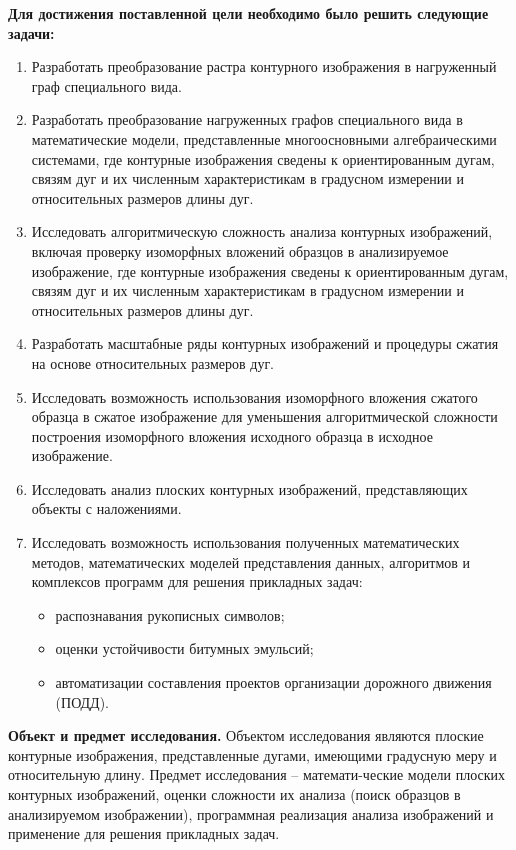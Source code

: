 \textbf{Для достижения поставленной цели необходимо было решить следующие задачи:}	
\begin{enumerate}
\item Разработать преобразование растра контурного изображения в нагруженный граф специального вида.
\item Разработать преобразование нагруженных графов специального вида в математические модели, представленные многоосновными алгебраическими системами, где контурные изображения сведены к ориентированным дугам, связям дуг и их численным характеристикам в градусном измерении и  относительных размеров  длины дуг.
\item Исследовать алгоритмическую сложность  анализа контурных изображений, включая проверку изоморфных вложений образцов в анализируемое изображение, где контурные изображения сведены к ориентированным дугам, связям дуг и их численным характеристикам в градусном измерении и  относительных размеров  длины дуг.
\item Разработать  масштабные ряды контурных изображений и процедуры сжатия на  основе относительных размеров дуг.
\item Исследовать возможность использования  изоморфного вложения сжатого образца в сжатое изображение для уменьшения алгоритмической сложности построения  изоморфного вложения исходного образца в исходное изображение.
\item Исследовать анализ плоских контурных изображений, представляющих объекты с наложениями.
\item Исследовать возможность использования полученных математических методов, математических моделей представления данных, алгоритмов и комплексов программ для решения прикладных задач:
\begin{itemize}
   \item распознавания рукописных символов;
   \item  оценки устойчивости битумных эмульсий;
   \item  автоматизации составления проектов организации дорожного движения (ПОДД). 
\end{itemize}
\end{enumerate}

\textbf{Объект и предмет исследования.}  Объектом исследования являются плоские контурные изображения, представленные дугами, имеющими градусную меру и относительную длину. Предмет исследования – математи-ческие модели плоских контурных изображений, оценки сложности их анализа (поиск образцов в анализируемом изображении), программная реализация анализа изображений и применение для решения прикладных задач. 
	
